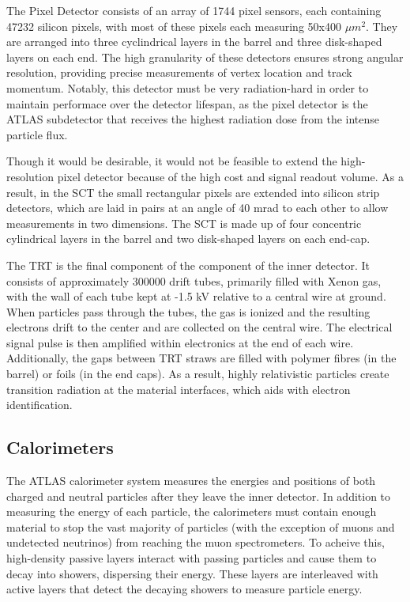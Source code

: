 The Pixel Detector consists of an array of 1744 pixel sensors, each containing 47232 silicon pixels, with most of these pixels each measuring 50x400 $\mu m^2$. They are arranged into three cyclindrical layers in the barrel and three disk-shaped layers on each end. The high granularity of these detectors ensures strong angular resolution, providing precise measurements of vertex location and track momentum. Notably, this detector must be very radiation-hard in order to maintain performace over the detector lifespan, as the pixel detector is the ATLAS subdetector that receives the highest radiation dose from the intense particle flux.

Though it would be desirable, it would not be feasible to extend the high-resolution pixel detector because of the high cost and signal readout volume. As a result, in the SCT the small rectangular pixels are extended into silicon strip detectors, which are laid in pairs at an angle of 40 mrad to each other to allow measurements in two dimensions. The SCT is made up of four concentric cylindrical layers in the barrel and two disk-shaped layers on each end-cap.

The TRT is the final component of the component of the inner detector.  It consists of approximately 300000 drift tubes, primarily filled with Xenon gas, with the wall of each tube kept at -1.5 kV relative to a central wire at ground. When particles pass through the tubes, the gas is ionized and the resulting electrons drift to the center and are collected on the central wire.  The electrical signal pulse is then amplified within electronics at the end of each wire. Additionally, the gaps between TRT straws are filled with polymer fibres (in the barrel) or foils (in the end caps). As a result, highly relativistic particles create transition radiation at the material interfaces, which aids with electron identification.

\subsection{Calorimeters}
The ATLAS calorimeter system measures the energies and positions of both charged and neutral particles after they leave the inner detector. In addition to measuring the energy of each particle, the calorimeters must contain enough material to stop the vast majority of particles (with the exception of muons and undetected neutrinos) from reaching the muon spectrometers. To acheive this, high-density passive layers interact with passing particles and cause them to decay into showers, dispersing their energy. These layers are interleaved with active layers that detect the decaying showers to measure particle energy.

